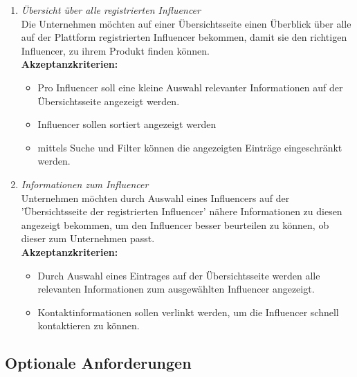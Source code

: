 \documentclass[conference,a4paper,flushend]{cs-techrep}
\begin{document}
\begin{enumerate}
\item{\textit{Übersicht über alle registrierten Influencer}\\
Die Unternehmen möchten auf einer Übersichtsseite einen Überblick über alle auf der Plattform registrierten Influencer bekommen, damit sie den richtigen Influencer, zu ihrem Produkt finden können. \\
 \textbf{Akzeptanzkriterien:}
\begin{itemize}
\item{Pro Influencer soll eine kleine Auswahl relevanter Informationen auf der Übersichtsseite angezeigt werden.}

\item{Influencer sollen sortiert angezeigt werden}

\item{mittels Suche und Filter können die angezeigten Einträge eingeschränkt werden.\\}
\end{itemize}}



\item{\textit{Informationen zum Influencer}\\
Unternehmen möchten durch Auswahl eines Influencers auf der 'Übersichtsseite der registrierten Influencer' nähere Informationen zu diesen angezeigt bekommen, um den Influencer besser beurteilen zu können, ob dieser zum Unternehmen passt.\\
 \textbf{Akzeptanzkriterien:}
 \begin{itemize}
\item{Durch Auswahl eines Eintrages auf der Übersichtsseite werden alle relevanten Informationen zum ausgewählten Influencer angezeigt.}
\item{Kontaktinformationen sollen verlinkt werden, um die Influencer schnell kontaktieren zu können.\\}
\end{itemize}}
\end{enumerate}



\subsection{Optionale Anforderungen} %
\end{document}
